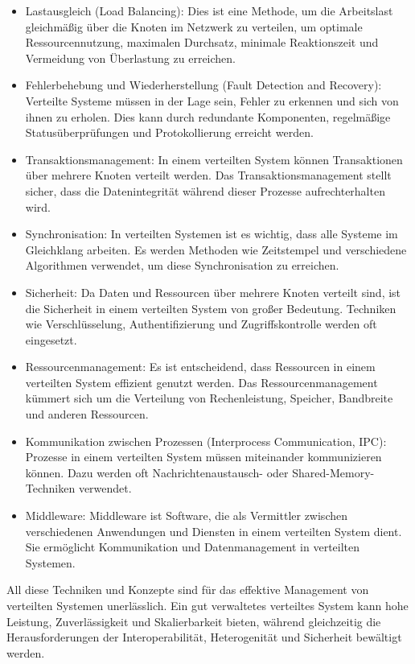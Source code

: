 \begin{itemize} 
\item Lastausgleich (Load Balancing): Dies ist eine Methode, um die Arbeitslast gleichmäßig über die Knoten im Netzwerk zu verteilen, um optimale Ressourcennutzung, maximalen Durchsatz, minimale Reaktionszeit und Vermeidung von Überlastung zu erreichen.
\item Fehlerbehebung und Wiederherstellung (Fault Detection and Recovery): Verteilte Systeme müssen in der Lage sein, Fehler zu erkennen und sich von ihnen zu erholen. Dies kann durch redundante Komponenten, regelmäßige Statusüberprüfungen und Protokollierung erreicht werden.
\item Transaktionsmanagement: In einem verteilten System können Transaktionen über mehrere Knoten verteilt werden. Das Transaktionsmanagement stellt sicher, dass die Datenintegrität während dieser Prozesse aufrechterhalten wird.
\item Synchronisation: In verteilten Systemen ist es wichtig, dass alle Systeme im Gleichklang arbeiten. Es werden Methoden wie Zeitstempel und verschiedene Algorithmen verwendet, um diese Synchronisation zu erreichen.
\item Sicherheit: Da Daten und Ressourcen über mehrere Knoten verteilt sind, ist die Sicherheit in einem verteilten System von großer Bedeutung. Techniken wie Verschlüsselung, Authentifizierung und Zugriffskontrolle werden oft eingesetzt.
\item Ressourcenmanagement: Es ist entscheidend, dass Ressourcen in einem verteilten System effizient genutzt werden. Das Ressourcenmanagement kümmert sich um die Verteilung von Rechenleistung, Speicher, Bandbreite und anderen Ressourcen.
\item Kommunikation zwischen Prozessen (Interprocess Communication, IPC): Prozesse in einem verteilten System müssen miteinander kommunizieren können. Dazu werden oft Nachrichtenaustausch- oder Shared-Memory-Techniken verwendet.
\item Middleware: Middleware ist Software, die als Vermittler zwischen verschiedenen Anwendungen und Diensten in einem verteilten System dient. Sie ermöglicht Kommunikation und Datenmanagement in verteilten Systemen.
\end{itemize} 
All diese Techniken und Konzepte sind für das effektive Management von verteilten Systemen unerlässlich. Ein gut verwaltetes verteiltes System kann hohe Leistung, Zuverlässigkeit und Skalierbarkeit bieten, während gleichzeitig die Herausforderungen der Interoperabilität, Heterogenität und Sicherheit bewältigt werden.
